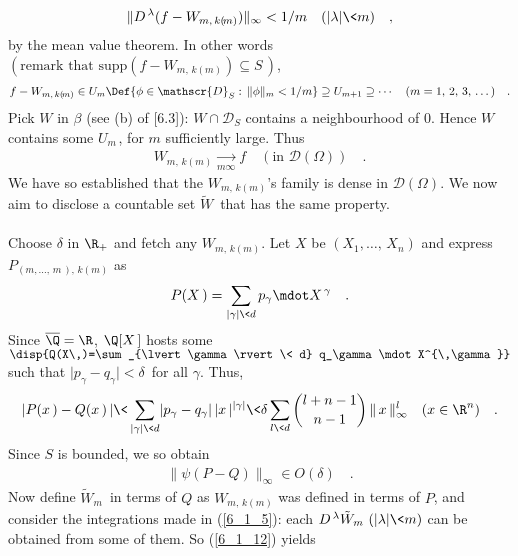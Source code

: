 \begin{align}\label{6_1_7}
\|D^{\, \lambda } (f   -W_{m,\, k(\!m)}  )  \|_\infty < 1/m \quad ( \lvert \lambda \rvert \< m )\quad ,
\end{align}
by the mean value theorem. In other words $(\text{remark that }\text{supp} (f   -W_{m,\, k(\!m)}) \subseteq S\,)$,  
\begin{align}\label{6_1_8}
f- W_{m,\, k(\!m)}  \in U_m \Def \{ \phi \in \mathscr{D}_S :\, \| \phi \|_m< 1/m \} \supseteq  U_{m+1}\supseteq  \dotsb \quad( m=1,\, 2,\, 3,\, \dots) \quad  .
\end{align}
Pick $W$ in $\beta$ (see (b) of [6.3]): $W\cap\mathscr{D}_S$ contains a neighbourhood of $0$. Hence $W$ contains some $U_{m\,}$, for $m$ sufficiently large. Thus 
\begin{align}\label{6_1_9}
W_{m,\, k(\!m) } \underset{m\infty} {\longrightarrow} f  \quad  (\text{in } \mathscr{D}(\Omega))\quad .
\end{align}
We have so established that the $W_{m,\, k(\!m)}$'s family is dense in $\mathscr{D}(\Omega)$. We now aim to disclose a  countable set $\tilde{W}\,$ that has the same property.\\
\\
Choose $\delta $ in $\R_+$ and fetch any $W_{m,\, k(\!m)}$. Let $X$ be $(X_1,\dotsc,\, X_n)$ and express $P_{(m,\dotsc,\, m\,),\, k(\!m)}$ as 
\begin{align}\label{6_1_10}
P(X\,)=\sum_{\lvert \gamma \rvert \< d} p_\gamma \mdot X^{\,\gamma} \quad  .
\end{align}
Since $\overline{\Q}=\R$, $\Q[X\,]$ hosts some $\disp{Q(X\,)=\sum_{\lvert \gamma \rvert \< d} q_\gamma \mdot X^{\,\gamma}}$ such that $\lvert p_\gamma - q_\gamma\rvert < \delta\,$ for all $\gamma$. Thus,
\begin{align}\label{6_1_11}
\lvert P(x\,)-Q(x\,) \,\rvert \<   \sum_{\lvert \gamma \rvert \< d} \lvert p_\gamma-q_\gamma\rvert\, \lvert x\,\rvert^{\lvert \gamma\rvert} \< \delta \sum_{l  \< d} \binom{l+n-1}{n-1}\, \| \, x\, \|^{l}_\infty \quad (x\in \R^n)\quad .
\end{align}
Since $S$ is bounded, we so obtain
\begin{align}\label{6_1_12}
 \|\psi (P- Q) \|_\infty  \in O(\delta) \quad .
\end{align}
Now define $\tilde{W}_m\,$ in terms of $Q$ as $W_{m,\, k(\!m)}$ was defined in terms of $P$, and consider the integrations made in (\ref{6_1_5}): each $D^{\,\lambda} \tilde{W}_m\,\, (\lvert \lambda \rvert\< m)$ can be obtained from some of them. So (\ref{6_1_12}) yields
